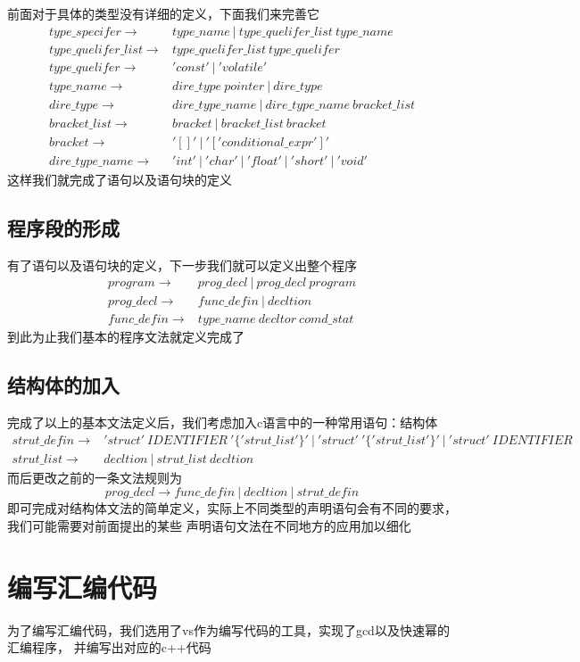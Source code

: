 \documentclass[UTF8]{ctexart}
\begin{document}
前面对于具体的类型没有详细的定义，下面我们来完善它
\begin{align*}
    type\_specifer\to & type\_name\ |\ type\_quelifer\_list\ type\_name\\
    type\_quelifer\_list\to & type\_quelifer\_list\ type\_quelifer\\
    type\_quelifer\to & 'const'\ |\ 'volatile'\\
    type\_name\to & dire\_type\ pointer\ |\ dire\_type\\
    dire\_type\to & dire\_type\_name\ |\ dire\_type\_name\ bracket\_list\\
    bracket\_list\to & bracket\ |\ bracket\_list\ bracket\\
    bracket\to & '[]'\ |\ '['conditional\_expr']'\\
    dire\_type\_name\to & 'int'\ |\ 'char'\ |\ 'float'\ |\ 'short'\ |\ 'void'
\end{align*}
这样我们就完成了语句以及语句块的定义
\subsection{程序段的形成}
有了语句以及语句块的定义，下一步我们就可以定义出整个程序
\begin{align*}
    program\to & prog\_decl\ |\ prog\_decl\ program\\
    prog\_decl\to & func\_defin\ |\ decltion\\
    func\_defin\to & type\_name\ decltor\ comd\_stat
\end{align*}
到此为止我们基本的程序文法就定义完成了
\subsection{结构体的加入}
完成了以上的基本文法定义后，我们考虑加入c语言中的一种常用语句：结构体
\begin{align*}
    strut\_defin\to & 'struct'\ IDENTIFIER\ '\{'strut\_list'\}'\ |\ 'struct'\ '\{'strut\_list'\}'\ |\ 'struct'\ IDENTIFIER\\
    strut\_list\to & decltion\ |\ strut\_list\ decltion
\end{align*}
而后更改之前的一条文法规则为
\begin{equation*}
    prog\_decl\to func\_defin\ |\ decltion\ |\ strut\_defin
\end{equation*}
即可完成对结构体文法的简单定义，实际上不同类型的声明语句会有不同的要求，我们可能需要对前面提出的某些
声明语句文法在不同地方的应用加以细化
\section{编写汇编代码}
为了编写汇编代码，我们选用了vs作为编写代码的工具，实现了gcd以及快速幂的汇编程序，
并编写出对应的c++代码
\end{document}
